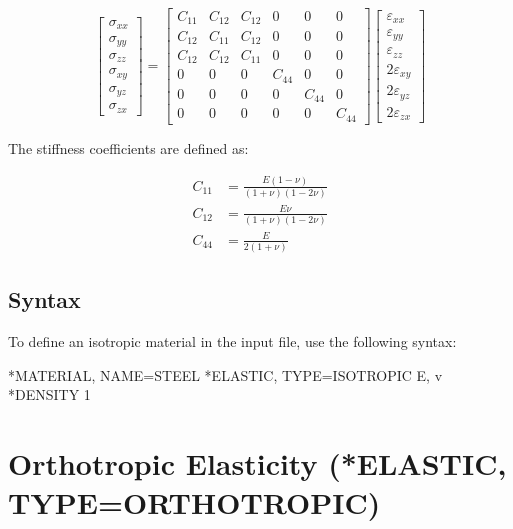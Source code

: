 \[
\begin{bmatrix}
\sigma_{xx} \\
\sigma_{yy} \\
\sigma_{zz} \\
\sigma_{xy} \\
\sigma_{yz} \\
\sigma_{zx}
\end{bmatrix}
=
\begin{bmatrix}
C_{11} & C_{12} & C_{12} & 0 & 0 & 0 \\
C_{12} & C_{11} & C_{12} & 0 & 0 & 0 \\
C_{12} & C_{12} & C_{11} & 0 & 0 & 0 \\
0      & 0      & 0      & C_{44} & 0 & 0 \\
0      & 0      & 0      & 0 & C_{44} & 0 \\
0      & 0      & 0      & 0 & 0 & C_{44}
\end{bmatrix}
\begin{bmatrix}
\varepsilon_{xx} \\
\varepsilon_{yy} \\
\varepsilon_{zz} \\
2\varepsilon_{xy} \\
2\varepsilon_{yz} \\
2\varepsilon_{zx}
\end{bmatrix}
\]

The stiffness coefficients are defined as:

\[
\begin{aligned}
C_{11} &= \frac{E(1 - \nu)}{(1 + \nu)(1 - 2\nu)} \\
C_{12} &= \frac{E\nu}{(1 + \nu)(1 - 2\nu)} \\
C_{44} &= \frac{E}{2(1 + \nu)}
\end{aligned}
\]

\subsection{Syntax}

To define an isotropic material in the input file, use the following syntax:

\begin{codeBlock}
*MATERIAL, NAME=STEEL
*ELASTIC, TYPE=ISOTROPIC
E, v
*DENSITY
1
\end{codeBlock}

\section{Orthotropic Elasticity (*ELASTIC, TYPE=ORTHOTROPIC)}

